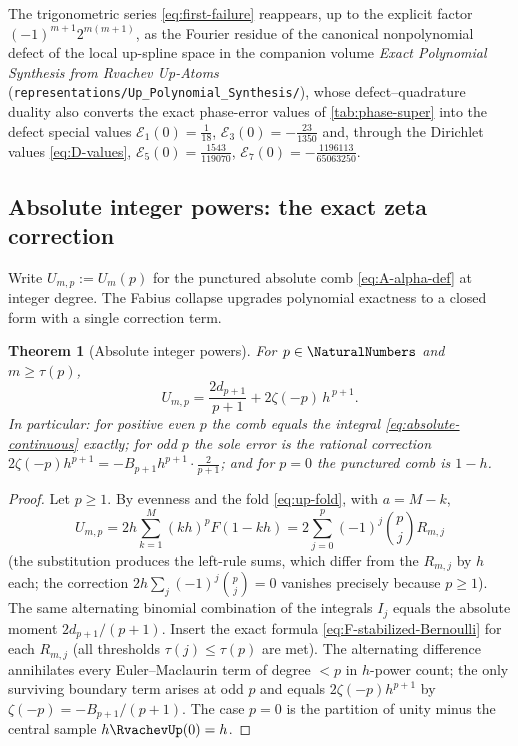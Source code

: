 \documentclass[11pt,oneside]{article}
\numberwithin{equation}{section}
\newtheorem{theorem}{Theorem}[section]
\theoremstyle{definition}
\theoremstyle{remark}
\begin{document}
\begin{remark}
The trigonometric series \eqref{eq:first-failure} reappears, up to
the explicit factor $(-1)^{m+1}2^{m(m+1)}$, as the Fourier residue of
the canonical nonpolynomial defect of the local up-spline space in
the companion volume \emph{Exact Polynomial Synthesis from Rvachev
Up-Atoms} (\nolinkurl{representations/Up_Polynomial_Synthesis/}),
whose defect--quadrature duality also converts the exact phase-error
values of \cref{tab:phase-super} into the defect special values
$\mathcal E_1(0)=\tfrac1{18}$,
$\mathcal E_3(0)=-\tfrac{23}{1350}$ and, through the Dirichlet
values \eqref{eq:D-values},
$\mathcal E_5(0)=\tfrac{1543}{119070}$,
$\mathcal E_7(0)=-\tfrac{1196113}{65063250}$.
\end{remark}

\subsection{Absolute integer powers: the exact zeta correction}

Write $U_{m,p}:=U_m(p)$ for the punctured absolute comb
\eqref{eq:A-alpha-def} at integer degree.  The Fabius collapse
upgrades polynomial exactness to a closed form with a single
correction term.

\begin{theorem}[Absolute integer powers]
\label{thm:absolute-integer}
For $p\in\NaturalNumbers$ and $m\ge\tau(p)$,
\begin{equation}
 \boxed{\;
 U_{m,p}
 =\frac{2d_{p+1}}{p+1}
 +2\zeta(-p)\,h^{\,p+1}.
 \;}
 \label{eq:absolute-integer-closed}
\end{equation}
In particular: for positive even $p$ the comb equals the integral
\eqref{eq:absolute-continuous} \emph{exactly}; for odd $p$ the sole
error is the rational correction $2\zeta(-p)h^{p+1}
=-B_{p+1}h^{p+1}\cdot\frac{2}{p+1}$; and for $p=0$ the punctured comb
is $1-h$.
\end{theorem}

\begin{proof}
Let $p\ge1$.  By evenness and the fold \eqref{eq:up-fold}, with
$a=M-k$,
\[
 U_{m,p}
 =2h\sum_{k=1}^{M}(kh)^{p}F(1-kh)
 =2\sum_{j=0}^{p}(-1)^{j}\binom pj R_{m,j}
\]
(the substitution produces the left-rule sums, which differ from the
$R_{m,j}$ by $h$ each; the correction
$2h\sum_j(-1)^{j}\binom pj=0$ vanishes precisely because $p\ge1$).
The same alternating binomial combination of the integrals $I_j$
equals the absolute moment $2d_{p+1}/(p+1)$.  Insert the exact
formula \eqref{eq:F-stabilized-Bernoulli} for each $R_{m,j}$ (all
thresholds $\tau(j)\le\tau(p)$ are met).  The alternating difference
annihilates every Euler--Maclaurin term of degree $<p$ in $h$-power
count; the only surviving boundary term arises at odd $p$ and equals
$2\zeta(-p)h^{p+1}$ by $\zeta(-p)=-B_{p+1}/(p+1)$.  The case $p=0$ is
the partition of unity minus the central sample $h\RvachevUp(0)=h$.
\end{proof}
\end{document}
